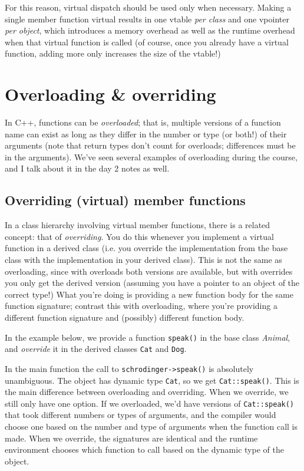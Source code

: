 \documentclass[a4paper]{scrartcl}
\begin{document}
For this reason, virtual dispatch should be used only when necessary. Making a single member function virtual results in one vtable \emph{per class} and one vpointer \emph{per object}, which introduces a memory overhead as well as the runtime overhead when that virtual function is called (of course, once you already have a virtual function, adding more only increases the size of the vtable!)

\section{Overloading \& overriding}
In C++, functions can be \emph{overloaded}; that is, multiple versions of a function name can exist as long as they differ in the number or type (or both!) of their arguments (note that return types don't count for overloads; differences must be in the arguments). We've seen several examples of overloading during the course, and I talk about it in the day 2 notes as well.

\subsection{Overriding (virtual) member functions}
In a class hierarchy involving virtual member functions, there is a related concept: that of \emph{overriding}. You do this whenever you implement a virtual function in a derived class (i.e. you override the implementation from the base class with the implementation in your derived class). This is not the same as overloading, since with overloads both versions are available, but with overrides you only get the derived version (assuming you have a pointer to an object of the correct type!) What you're doing is providing a new function body for the same function signature; contrast this with overloading, where you're providing a different function signature and (possibly) different function body.

In the example below, we provide a function \verb|speak()| in the base class \emph{Animal}, and \emph{override} it in the derived classes \verb|Cat| and \verb|Dog|.



In the main function the call to \verb|schrodinger->speak()| is absolutely unambiguous. The object has dynamic type \verb|Cat|, so we get \verb|Cat::speak()|. This is the main difference between overloading and overriding. When we override, we still only have one option. If we overloaded, we'd have versions of \verb|Cat::speak()| that took different numbers or types of arguments, and the compiler would choose one based on the number and type of arguments when the function call is made. When we override, the signatures are identical and the runtime environment chooses which function to call based on the dynamic type of the object.
\end{document}
